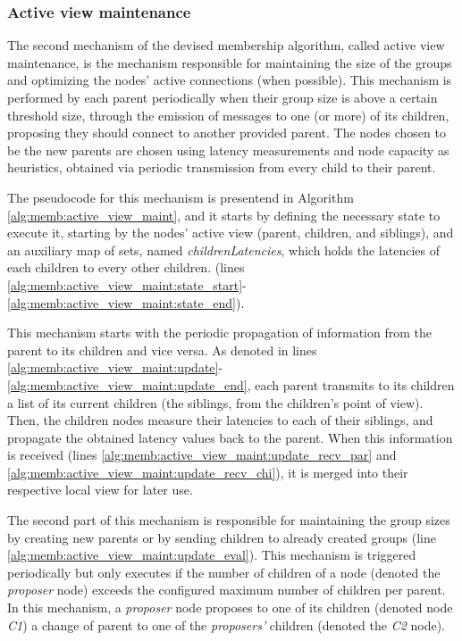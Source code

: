 \subsubsection{Active view maintenance} \label{sec:overlay_network:active_view_maint}

The second mechanism of the devised membership algorithm, called active view maintenance, is the mechanism responsible for maintaining the size of the groups and optimizing the nodes' active connections (when possible). This mechanism is performed by each parent periodically when their group size is above a certain threshold size, through the emission of messages to one (or more) of its children, proposing they should connect to another provided parent. The nodes chosen to be the new parents are chosen using latency measurements and node capacity as heuristics, obtained via periodic transmission from every child to their parent. 

The pseudocode for this mechanism is presentend in Algorithm \ref{alg:memb:active_view_maint}, and it starts by defining the necessary state to execute it, starting by the nodes' active view (parent, children, and siblings), and an auxiliary map of sets, named \textit{childrenLatencies}, which holds the latencies of each children to every other children. (lines \ref{alg:memb:active_view_maint:state_start}-\ref{alg:memb:active_view_maint:state_end}). 



This mechanism starts with the periodic propagation of information from the parent to its children and vice versa. As denoted in lines \ref{alg:memb:active_view_maint:update}-\ref{alg:memb:active_view_maint:update_end}, each parent transmits to its children a list of its current children (the siblings, from the children's point of view). Then, the children nodes measure their latencies to each of their siblings, and propagate the obtained latency values back to the parent. When this information is received (lines \ref{alg:memb:active_view_maint:update_recv_par} and \ref{alg:memb:active_view_maint:update_recv_chi}), it is merged into their respective local view for later use.

The second part of this mechanism is responsible for maintaining the group sizes by creating new parents or by sending children to already created groups (line \ref{alg:memb:active_view_maint:update_eval}). This mechanism is triggered periodically but only executes if the number of children of a  node (denoted the \textit{proposer} node) exceeds the configured maximum number of children per parent. In this mechanism, a \textit{proposer} node proposes to one of its children (denoted node \textit{C1}) a change of parent to one of the \textit{proposers'} children (denoted the \textit{C2} node).


